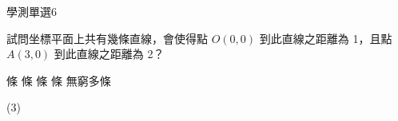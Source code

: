 \begin{QUESTIONS}
    \begin{QUESTION}
        \begin{ExamInfo}{98}{學測}{單選}{6}
        \end{ExamInfo}
        \begin{ExamAnsRateInfo}{33}{58}{27}{14}
        \end{ExamAnsRateInfo}
        \begin{QBODY}
            試問坐標平面上共有幾條直線，會使得點 $O(0,0)$ 到此直線之距離為 1，且點 $A(3,0)$ 到此直線之距離為 2？
			\begin{QOPS} 
				 條        
				 條 
				 條 
				 條 
				\QOP 無窮多條
			\end{QOPS}
        \end{QBODY}
        \begin{QFROMS}
        \end{QFROMS}
        \begin{QTAGS}\end{QTAGS}
        \begin{QANS}
            (3)
        \end{QANS}
        \begin{QSOLLIST}
        \end{QSOLLIST}
        \begin{QEMPTYSPACE}
        \end{QEMPTYSPACE}
    \end{QUESTION}
\end{QUESTIONS}
